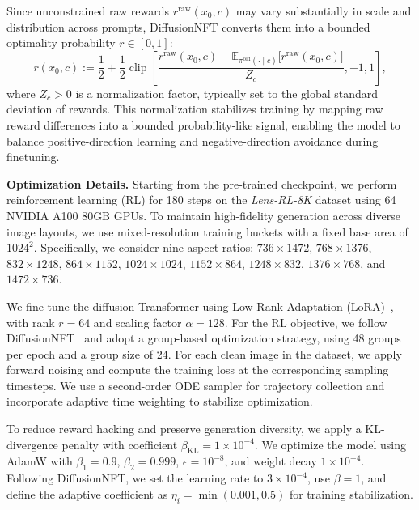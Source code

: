 Since unconstrained raw rewards $r^{\mathrm{raw}}(x_0,c)$ may vary substantially in scale and distribution across prompts, DiffusionNFT converts them into a bounded optimality probability $r \in [0,1]$:
\begin{equation*}
\label{eq:diffusion_nft_reward}
r(x_0,c) :=
\frac{1}{2}
+
\frac{1}{2}
\operatorname{clip}
\left[
\frac{
r^{\mathrm{raw}}(x_0,c)
-
\mathbb{E}_{\pi^{\mathrm{old}}(\cdot \mid c)}
\big[r^{\mathrm{raw}}(x_0,c)\big]
}{Z_c},
-1, 1
\right],
\end{equation*}
where $Z_c > 0$ is a normalization factor, typically set to the global standard deviation of rewards. This normalization stabilizes training by mapping raw reward differences into a bounded probability-like signal, enabling the model to balance positive-direction learning and negative-direction avoidance during finetuning.

\noindent\textbf{Optimization Details.}
Starting from the pre-trained checkpoint, we perform reinforcement learning (RL) for 180 steps on the \textit{Lens-RL-8K} dataset using 64 NVIDIA A100 80GB GPUs. To maintain high-fidelity generation across diverse image layouts, we use mixed-resolution training buckets with a fixed base area of $1024^2$. Specifically, we consider nine aspect ratios: $736\times1472$, $768\times1376$, $832\times1248$, $864\times1152$, $1024\times1024$, $1152\times864$, $1248\times832$, $1376\times768$, and $1472\times736$.

We fine-tune the diffusion Transformer using Low-Rank Adaptation (LoRA)~\citep{hu2022lora}, with rank $r{=}64$ and scaling factor $\alpha{=}128$. For the RL objective, we follow DiffusionNFT~\citep{zheng2025diffusionnft} and adopt a group-based optimization strategy, using 48 groups per epoch and a group size of 24. For each clean image in the dataset, we apply forward noising and compute the training loss at the corresponding sampling timesteps. We use a second-order ODE sampler for trajectory collection and incorporate adaptive time weighting to stabilize optimization.

To reduce reward hacking and preserve generation diversity, we apply a KL-divergence penalty with coefficient $\beta_{\text{KL}}{=}1\times10^{-4}$. We optimize the model using AdamW with $\beta_1{=}0.9$, $\beta_2{=}0.999$, $\epsilon{=}10^{-8}$, and weight decay $1\times10^{-4}$. Following DiffusionNFT, we set the learning rate to $3\times10^{-4}$, use $\beta{=}1$, and define the adaptive coefficient as $\eta_i=\min(0.001,0.5)$ for training stabilization.

